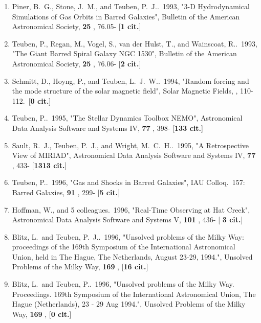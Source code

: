 \documentclass[11pt,letterpaper]{article}
\begin{document}
\begin{enumerate}[resume,label=\textbf{\arabic*}.]
\item  
Piner, B.~G., Stone, J.~M., and Teuben, P.~J..\  1993,  "3-D Hydrodynamical 
Simulations of Gas Orbits in Barred Galaxies", Bulletin of the American 
Astronomical Society,  {\bf 25} , 76.05- [{\bf 1 cit.}] 

\item  
Teuben, P., Regan, M., Vogel, S., van der Hulst, T., and Wainscoat, R..\  
1993,  "The Giant Barred Spiral Galaxy NGC 1530", Bulletin of the American 
Astronomical Society,  {\bf 25} , 76.06- [{\bf 2 cit.}] 

\item  
Schmitt, D., Hoyng, P., and Teuben, L.~J.~W..\  1994,  "Random forcing and 
the mode structure of the solar magnetic field", Solar Magnetic Fields,  , 
110-112.\  [{\bf 0 cit.}] 

\item  
Teuben, P..\  1995,  "The Stellar Dynamics Toolbox NEMO", Astronomical Data 
Analysis Software and Systems IV,  {\bf 77} , 398- [{\bf 133 cit.}] 

\item  
Sault, R.~J., Teuben, P.~J., and Wright, M.~C.~H..\  1995,  "A 
Retrospective View of MIRIAD", Astronomical Data Analysis Software and 
Systems IV,  {\bf 77} , 433- [{\bf 1313 cit.}] 

\item  
Teuben, P..\  1996,  "Gas and Shocks in Barred Galaxies", IAU Colloq.~157: 
Barred Galaxies,  {\bf 91} , 299- [{\bf 5 cit.}] 

\item  
Hoffman, W., and 5 colleagues.\  1996,  "Real-Time Observing at Hat Creek", 
Astronomical Data Analysis Software and Systems V,  {\bf 101} , 436- [{\bf 
3 cit.}] 

\item  
Blitz, L.~and Teuben, P.~J..\  1996,  "Unsolved problems of the Milky Way: 
proceedings of the 169th Symposium of the International Astronomical Union, 
held in The Hague, The Netherlands, August 23-29, 1994.", Unsolved Problems 
of the Milky Way,  {\bf 169} ,  [{\bf 16 cit.}] 

\item  
Blitz, L.~and Teuben, P..\  1996,  "Unsolved problems of the Milky Way. 
Proceedings. 169th Symposium of the International Astronomical Union, The 
Hague (Netherlands), 23 - 29 Aug 1994.", Unsolved Problems of the Milky 
Way,  {\bf 169} ,  [{\bf 0 cit.}] 


\end{enumerate}
\end{document}
